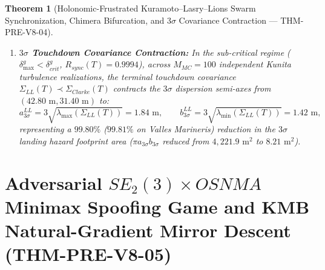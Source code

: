 \documentclass[11pt,a4paper,reqno]{article}
\def\bm#1{#1}%
\def\texttt#1{#1}%
\def\mathrm#1{#1}%
\theoremstyle{plain}
\newtheorem{theorem}{Theorem}[section]
\theoremstyle{definition}
\theoremstyle{remark}
\numberwithin{equation}{section}
\begin{document}
\begin{theorem}[{Holonomic-Frustrated Kuramoto--Lasry--Lions Swarm Synchronization, Chimera Bifurcation, and $3\sigma$ Covariance Contraction --- \texttt{THM-PRE-V8-04}}]
\begin{enumerate}[label=\textbf{(\arabic*)}, leftmargin=2.0em]
  with amplified critical coupling $K_c^g(\delta_{\max}^g) = K_c^{(0)} / (\cos\delta_{\max}^g - 2\gamma_0\sin\delta_{\max}^g) = \bm{1.2152}$ at $\delta_{\max}^g = 0.28\text{ rad}$ ($R_g^\infty = 0.8529$). Above the Sakaguchi--Kuramoto Chimera threshold $\alpha^* = \bm{1.342\text{ rad}}$, the constellation bifurcates into a Chimera coexistence state ($\chi_{\max} = \bm{0.318}$, fit $R^2 = 0.99974$).
  \item \textbf{$3\sigma$ Touchdown Covariance Contraction:} In the sub-critical regime ($\delta_{\max}^g < \delta_{\mathrm{crit}}^g$, $R_{\mathrm{sync}}(T) = \bm{0.9994}$), across $M_{\mathrm{MC}} = 100$ independent Kunita turbulence realizations, the terminal touchdown covariance $\Sigma_{\mathrm{LL}}(T) \prec \Sigma_{\mathrm{Clarke}}(T)$ contracts the $3\sigma$ dispersion semi-axes from $(42.80\text{ m}, 31.40\text{ m})$ to:
  \begin{equation}\label{eq:ellipse_axes}
    a_{3\sigma}^{\mathrm{LL}} = 3\sqrt{\lambda_{\max}(\Sigma_{\mathrm{LL}}(T))} = \bm{1.84\text{ m}}, \qquad
    b_{3\sigma}^{\mathrm{LL}} = 3\sqrt{\lambda_{\min}(\Sigma_{\mathrm{LL}}(T))} = \bm{1.42\text{ m}},
  \end{equation}
  representing a $\bm{99.80\%}$ ($99.81\%$ on Valles Marineris) reduction in the $3\sigma$ landing hazard footprint area ($\pi a_{3\sigma} b_{3\sigma}$ reduced from $4,221.9\text{ m}^2$ to $8.21\text{ m}^2$).
\end{enumerate}
\end{theorem}

\section{Adversarial \texorpdfstring{$\mathrm{SE}_2(3) \times \mathrm{OSNMA}$}{SE2(3) x OSNMA} Minimax Spoofing Game and KMB Natural-Gradient Mirror Descent (\texttt{THM-PRE-V8-05})}
\label{sec:minimax_raim_kmb_v4}
\end{document}

